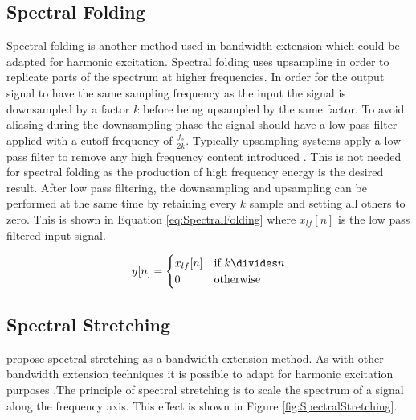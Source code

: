 	\subsection{Spectral Folding}
	\label{sec:Excitation-Methods-SpectralFolding}
		Spectral folding is another method used in bandwidth extension \citep{friedrich2007spectral} which could be
		adapted for harmonic excitation. Spectral folding uses upsampling in order to replicate parts of the
		spectrum at higher frequencies. In order for the output signal to have the same sampling frequency as the
		input the signal is downsampled by a factor $k$ before being upsampled by the same factor. To avoid
		aliasing during the downsampling phase the signal should have a low pass filter applied with a cutoff
		frequency of $\frac{f_{s}}{2k}$. Typically upsampling systems apply a low pass filter to remove any high
		frequency content introduced \citep{oppenheim2014discrete}. This is not needed for spectral folding as the
		production of high frequency energy is the desired result. After low pass filtering, the downsampling and
		upsampling can be performed at the same time by retaining every $k$ sample and setting all others
		to zero. This is shown in Equation \ref{eq:SpectralFolding} where $x_{lf}[n]$ is the low pass filtered
		input signal.

		\begin{equation}
			y[n] = \begin{cases}
				x_{lf}[n] & \text{if $k \divides n$} \\
				0 & \text{otherwise}
			\end{cases}
			\label{eq:SpectralFolding}
		\end{equation}

	\subsection{Spectral Stretching}
	\label{sec:Excitation-Methods-SpectralStretching}
		\citet{nagel2009a} propose spectral stretching as a bandwidth extension method. As with other bandwidth
		extension techniques it is possible to adapt for harmonic excitation purposes .The principle of spectral
		stretching is to scale the spectrum of a signal along the frequency axis. This effect is shown in Figure
		\ref{fig:SpectralStretching}.

